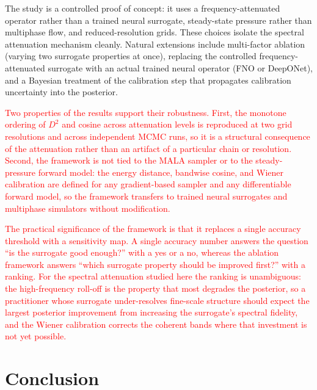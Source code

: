 \documentclass[12pt]{article}
\newcommand{\add}[1]{\textcolor{red}{#1}}
\begin{document}
The study is a controlled proof of concept: it uses a frequency-attenuated operator rather than a trained neural surrogate, steady-state pressure rather than multiphase flow, and reduced-resolution grids. These choices isolate the spectral attenuation mechanism cleanly. Natural extensions include multi-factor ablation (varying two surrogate properties at once), replacing the controlled frequency-attenuated surrogate with an actual trained neural operator (FNO or DeepONet), and a Bayesian treatment of the calibration step that propagates calibration uncertainty into the posterior.

\add{Two properties of the results support their robustness. First, the monotone ordering of $D^{2}$ and cosine across attenuation levels is reproduced at two grid resolutions and across independent MCMC runs, so it is a structural consequence of the attenuation rather than an artifact of a particular chain or resolution. Second, the framework is not tied to the MALA sampler or to the steady-pressure forward model: the energy distance, bandwise cosine, and Wiener calibration are defined for any gradient-based sampler and any differentiable forward model, so the framework transfers to trained neural surrogates and multiphase simulators without modification.}

\add{The practical significance of the framework is that it replaces a single accuracy threshold with a sensitivity map. A single accuracy number answers the question ``is the surrogate good enough?'' with a yes or a no, whereas the ablation framework answers ``which surrogate property should be improved first?'' with a ranking. For the spectral attenuation studied here the ranking is unambiguous: the high-frequency roll-off is the property that most degrades the posterior, so a practitioner whose surrogate under-resolves fine-scale structure should expect the largest posterior improvement from increasing the surrogate's spectral fidelity, and the Wiener calibration corrects the coherent bands where that investment is not yet possible.}

\section{Conclusion}
\end{document}
